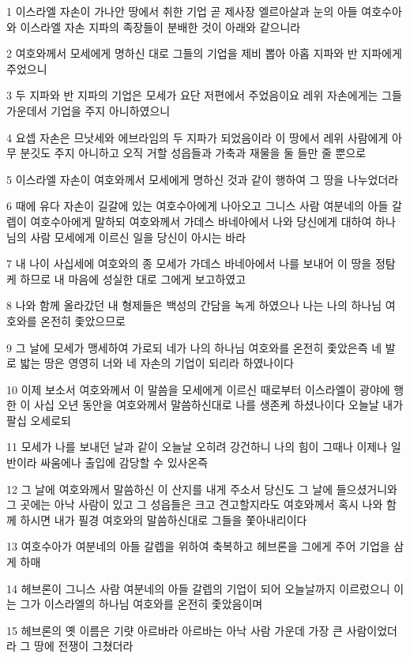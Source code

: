 \par 1 이스라엘 자손이 가나안 땅에서 취한 기업 곧 제사장 엘르아살과 눈의 아들 여호수아와 이스라엘 자손 지파의 족장들이 분배한 것이 아래와 같으니라
\par 2 여호와께서 모세에게 명하신 대로 그들의 기업을 제비 뽑아 아홉 지파와 반 지파에게 주었으니
\par 3 두 지파와 반 지파의 기업은 모세가 요단 저편에서 주었음이요 레위 자손에게는 그들 가운데서 기업을 주지 아니하였으니
\par 4 요셉 자손은 므낫세와 에브라임의 두 지파가 되었음이라 이 땅에서 레위 사람에게 아무 분깃도 주지 아니하고 오직 거할 성읍들과 가축과 재물을 둘 들만 줄 뿐으로
\par 5 이스라엘 자손이 여호와께서 모세에게 명하신 것과 같이 행하여 그 땅을 나누었더라
\par 6 때에 유다 자손이 길갈에 있는 여호수아에게 나아오고 그니스 사람 여분네의 아들 갈렙이 여호수아에게 말하되 여호와께서 가데스 바네아에서 나와 당신에게 대하여 하나님의 사람 모세에게 이르신 일을 당신이 아시는 바라
\par 7 내 나이 사십세에 여호와의 종 모세가 가데스 바네아에서 나를 보내어 이 땅을 정탐케 하므로 내 마음에 성실한 대로 그에게 보고하였고
\par 8 나와 함께 올라갔던 내 형제들은 백성의 간담을 녹게 하였으나 나는 나의 하나님 여호와를 온전히 좇았으므로
\par 9 그 날에 모세가 맹세하여 가로되 네가 나의 하나님 여호와를 온전히 좇았은즉 네 발로 밟는 땅은 영영히 너와 네 자손의 기업이 되리라 하였나이다
\par 10 이제 보소서 여호와께서 이 말씀을 모세에게 이르신 때로부터 이스라엘이 광야에 행한 이 사십 오년 동안을 여호와께서 말씀하신대로 나를 생존케 하셨나이다 오늘날 내가 팔십 오세로되
\par 11 모세가 나를 보내던 날과 같이 오늘날 오히려 강건하니 나의 힘이 그때나 이제나 일반이라 싸움에나 출입에 감당할 수 있사온즉
\par 12 그 날에 여호와께서 말씀하신 이 산지를 내게 주소서 당신도 그 날에 들으셨거니와 그 곳에는 아낙 사람이 있고 그 성읍들은 크고 견고할지라도 여호와께서 혹시 나와 함께 하시면 내가 필경 여호와의 말씀하신대로 그들을 쫓아내리이다
\par 13 여호수아가 여분네의 아들 갈렙을 위하여 축복하고 헤브론을 그에게 주어 기업을 삼게 하매
\par 14 헤브론이 그니스 사람 여분네의 아들 갈렙의 기업이 되어 오늘날까지 이르렀으니 이는 그가 이스라엘의 하나님 여호와를 온전히 좇았음이며
\par 15 헤브론의 옛 이름은 기럇 아르바라 아르바는 아낙 사람 가운데 가장 큰 사람이었더라 그 땅에 전쟁이 그쳤더라

